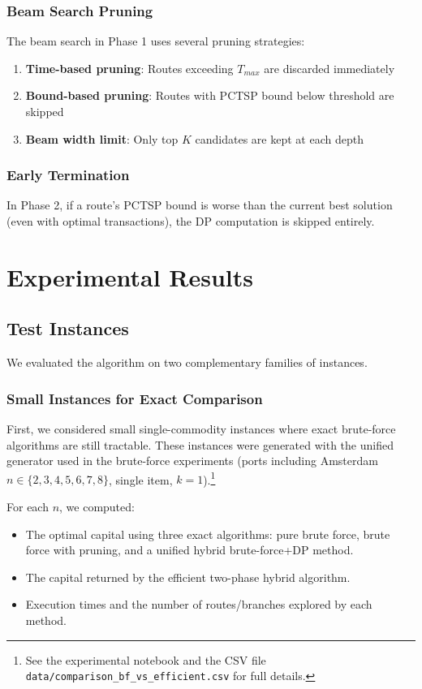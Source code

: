 \documentclass[12pt]{article}
\begin{document}
\subsubsection{Beam Search Pruning}

The beam search in Phase 1 uses several pruning strategies:
\begin{enumerate}
    \item \textbf{Time-based pruning}: Routes exceeding $T_{max}$ are discarded immediately
    \item \textbf{Bound-based pruning}: Routes with PCTSP bound below threshold are skipped
    \item \textbf{Beam width limit}: Only top $K$ candidates are kept at each depth
\end{enumerate}

\subsubsection{Early Termination}

In Phase 2, if a route's PCTSP bound is worse than the current best solution (even with optimal transactions), the DP computation is skipped entirely.

\section{Experimental Results}
\label{sec:results}

\subsection{Test Instances}

We evaluated the algorithm on two complementary families of instances.

\subsubsection{Small Instances for Exact Comparison}

First, we considered small single-commodity instances where exact brute-force algorithms are still tractable. These instances were generated with the unified generator used in the brute-force experiments (ports including Amsterdam $n \in \{2,3,4,5,6,7,8\}$, single item, $k=1$).\footnote{See the experimental notebook and the CSV file \texttt{data/comparison\_bf\_vs\_efficient.csv} for full details.}

For each $n$, we computed:
\begin{itemize}
    \item The optimal capital using three exact algorithms: pure brute force, brute force with pruning, and a unified hybrid brute-force+DP method.
    \item The capital returned by the efficient two-phase hybrid algorithm.
    \item Execution times and the number of routes/branches explored by each method.
\end{itemize}
\end{document}
